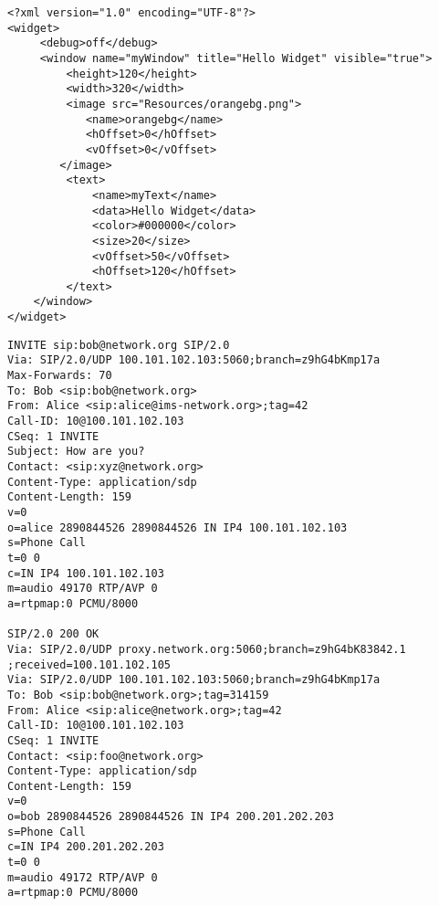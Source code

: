 
\begin{appendix}

\begin{lstlisting}
<?xml version="1.0" encoding="UTF-8"?>
<widget>
	 <debug>off</debug>
	 <window name="myWindow" title="Hello Widget" visible="true">
		 <height>120</height>
		 <width>320</width>
		 <image src="Resources/orangebg.png">
			<name>orangebg</name>
			<hOffset>0</hOffset>
			<vOffset>0</vOffset>
		</image>
		 <text>
			 <name>myText</name>
			 <data>Hello Widget</data>
			 <color>#000000</color>
			 <size>20</size>
			 <vOffset>50</vOffset>
			 <hOffset>120</hOffset>
		 </text>
	</window>
</widget>
\end{lstlisting}

\newpage


\begin{lstlisting}
INVITE sip:bob@network.org SIP/2.0
Via: SIP/2.0/UDP 100.101.102.103:5060;branch=z9hG4bKmp17a
Max-Forwards: 70
To: Bob <sip:bob@network.org>
From: Alice <sip:alice@ims-network.org>;tag=42
Call-ID: 10@100.101.102.103
CSeq: 1 INVITE
Subject: How are you?
Contact: <sip:xyz@network.org>
Content-Type: application/sdp
Content-Length: 159
v=0
o=alice 2890844526 2890844526 IN IP4 100.101.102.103
s=Phone Call
t=0 0
c=IN IP4 100.101.102.103
m=audio 49170 RTP/AVP 0
a=rtpmap:0 PCMU/8000

SIP/2.0 200 OK
Via: SIP/2.0/UDP proxy.network.org:5060;branch=z9hG4bK83842.1
;received=100.101.102.105
Via: SIP/2.0/UDP 100.101.102.103:5060;branch=z9hG4bKmp17a
To: Bob <sip:bob@network.org>;tag=314159
From: Alice <sip:alice@network.org>;tag=42
Call-ID: 10@100.101.102.103
CSeq: 1 INVITE
Contact: <sip:foo@network.org>
Content-Type: application/sdp
Content-Length: 159
v=0
o=bob 2890844526 2890844526 IN IP4 200.201.202.203
s=Phone Call
c=IN IP4 200.201.202.203
t=0 0
m=audio 49172 RTP/AVP 0
a=rtpmap:0 PCMU/8000
\end{lstlisting}


\end{appendix}

\endinput
